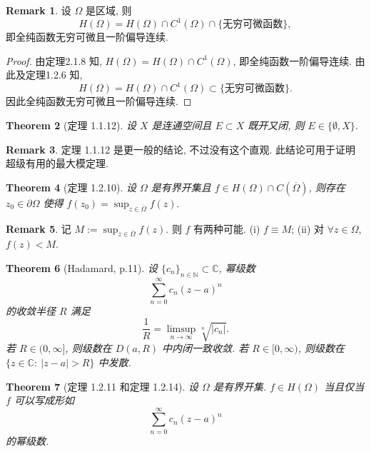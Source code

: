 \documentclass[a4paper,11pt]{article}
\newtheorem{theorem}{Theorem}[section]
\theoremstyle{definition}
\newtheorem{remark}[theorem]{Remark}
\begin{document}
\begin{CJK*}{UTF8}{gbsn}
\begin{remark}
    设 $ \Omega $ 是区域, 则 
    $$ 
        H(\Omega) = H(\Omega) \cap C^1(\Omega) \cap \{\text{无穷可微函数}\},
    $$
    即全纯函数无穷可微且一阶偏导连续.
\end{remark}

\begin{proof}
    由定理2.1.8 知, $ H(\Omega) = H(\Omega) \cap C^1(\Omega) $, 即全纯函数一阶偏导连续.
    由此及定理1.2.6 知,
    $$
        H(\Omega) = H(\Omega) \cap C^1(\Omega) \subset \{\text{无穷可微函数}\}.
    $$
    因此全纯函数无穷可微且一阶偏导连续.
\end{proof}

\begin{theorem}[定理 1.1.12]
    设 $ X $ 是连通空间且 $ E \subset X $ 既开又闭, 则 $ E \in \{\emptyset, X\} $.
\end{theorem}

\begin{remark}
    定理 1.1.12 是更一般的结论, 不过没有这个直观. 此结论可用于证明超级有用的最大模定理.
\end{remark}


\begin{theorem}[定理 1.2.10]
    设 $ \Omega $ 是有界开集且 $ f \in H(\Omega) \cap C(\overline{\Omega}) $, 
    则存在 $ z_0 \in \partial \Omega $ 使得
    $
        f(z_0) = \sup_{z \in \overline{\Omega}} f(z).
    $
\end{theorem}

\begin{remark}
    记
    $
        M := \sup_{z \in \overline{\Omega}} f(z).
    $
    则 $ f $ 有两种可能. (i) $ f \equiv M $; (ii) 对 $ \forall z \in \Omega $, $ f(z) < M $.
\end{remark}

\begin{theorem}[Hadamard, p.11]
    设 $ \{c_n\}_{n \in \mathbb{N}} \subset \mathbb{C} $, 幂级数
    $$
        \sum_{n=0}^\infty c_n (z - a)^n
    $$
    的收敛半径 $ R $ 满足
    $$
        \frac{1}{R} = \limsup_{n \to \infty} \sqrt[n]{|c_n|}.
    $$
    若 $ R \in (0, \infty] $, 则级数在 $ D(a, R) $ 中内闭一致收敛.
    若 $ R \in [0, \infty) $, 则级数在 $ \{z \in \mathbb{C} :\ |z - a| > R\} $ 中发散.
\end{theorem}

\begin{theorem}[定理 1.2.11 和定理 1.2.14]
    设 $ \Omega $ 是有界开集. 
    $ f \in H(\Omega) $ 当且仅当 $ f $ 可以写成形如
    $$
        \sum_{n=0}^\infty c_n (z - a)^n
    $$
    的幂级数.
\end{theorem}


\end{CJK*}
\end{document}
